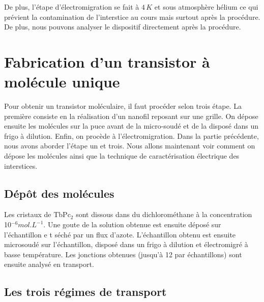 De plus, l'étape d'électromigration se fait à $4\,K$ et sous atmosphère hélium ce qui prévient la contamination de l'interstice au cours mais surtout après la procédure. De plus, nous pouvons analyser le dispositif directement après la procédure.


\section{Fabrication d'un transistor à molécule unique}
Pour obtenir un transistor moléculaire, il faut procéder selon trois étape. La première consiste en la réalisation d'un nanofil reposant sur une grille. On dépose ensuite les molécules sur la puce avant de la micro-soudé et de la disposé dans un frigo à dilution. Enfin, on procède à l'électromigration. Dans la partie précédente, nous avons aborder l'étape un et trois. Nous allons maintenant voir comment on dépose les molécules ainsi que la technique de caractérisation électrique des interstices.

\subsection{Dép\^ot des molécules}
Les cristaux de TbPc$_{2}$ sont dissous dans du dichlorométhane à la concentration 10$^{-6}mol.L^{-1}$. Une goute de la solution obtenue est ensuite déposé sur l'échantillon e t séché par un flux d'azote. L'échantillon obtenu est ensuite microsoudé sur l'échantillon, disposé dans un frigo à dilution et électromigré à basse température. Les jonctions obtenues (jusqu'à 12 par échantillons) sont ensuite analysé en transport.

\subsection{Les trois régimes de transport}
